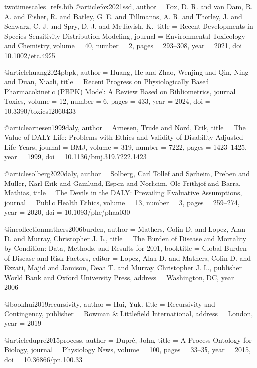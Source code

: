 \begin{filecontents*}{twotimescales_refs.bib}
	@article{fox2021ssd,
		author  = {Fox, D. R. and van Dam, R. A. and Fisher, R. and Batley, G. E. and Tillmanns, A. R. and Thorley, J. and Schwarz, C. J. and Spry, D. J. and McTavish, K.},
		title   = {Recent Developments in Species Sensitivity Distribution Modeling},
		journal = {Environmental Toxicology and Chemistry},
		volume  = {40},
		number  = {2},
		pages   = {293--308},
		year    = {2021},
		doi     = {10.1002/etc.4925}
	}
	
	@article{huang2024pbpk,
		author  = {Huang, He and Zhao, Wenjing and Qin, Ning and Duan, Xiaoli},
		title   = {Recent Progress on Physiologically Based Pharmacokinetic (PBPK) Model: A Review Based on Bibliometrics},
		journal = {Toxics},
		volume  = {12},
		number  = {6},
		pages   = {433},
		year    = {2024},
		doi     = {10.3390/toxics12060433}
	}
	
	@article{arnesen1999daly,
		author  = {Arnesen, Trude and Nord, Erik},
		title   = {The Value of DALY Life: Problems with Ethics and Validity of Disability Adjusted Life Years},
		journal = {BMJ},
		volume  = {319},
		number  = {7222},
		pages   = {1423--1425},
		year    = {1999},
		doi     = {10.1136/bmj.319.7222.1423}
	}
	
	@article{solberg2020daly,
		author  = {Solberg, Carl Tollef and S{\o}rheim, Preben and M{\"u}ller, Karl Erik and Gamlund, Espen and Norheim, Ole Frithjof and Barra, Mathias},
		title   = {The Devils in the DALY: Prevailing Evaluative Assumptions},
		journal = {Public Health Ethics},
		volume  = {13},
		number  = {3},
		pages   = {259--274},
		year    = {2020},
		doi     = {10.1093/phe/phaa030}
	}
	
	@incollection{mathers2006burden,
		author    = {Mathers, Colin D. and Lopez, Alan D. and Murray, Christopher J. L.},
		title     = {The Burden of Disease and Mortality by Condition: Data, Methods, and Results for 2001},
		booktitle = {Global Burden of Disease and Risk Factors},
		editor    = {Lopez, Alan D. and Mathers, Colin D. and Ezzati, Majid and Jamison, Dean T. and Murray, Christopher J. L.},
		publisher = {World Bank and Oxford University Press},
		address   = {Washington, DC},
		year      = {2006}
	}
	
	@book{hui2019recursivity,
		author    = {Hui, Yuk},
		title     = {Recursivity and Contingency},
		publisher = {Rowman \& Littlefield International},
		address   = {London},
		year      = {2019}
	}
	
	@article{dupre2015process,
		author  = {Dupr{\'e}, John},
		title   = {A Process Ontology for Biology},
		journal = {Physiology News},
		volume  = {100},
		pages   = {33--35},
		year    = {2015},
		doi     = {10.36866/pn.100.33}
	}
\end{filecontents*}

